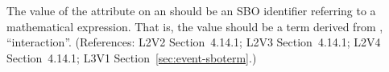 The value of the  attribute on an \Event should be
an SBO identifier referring to a mathematical expression.  That is, the
value should be a term derived from \sbointeractionID,
``interaction''.  (References: L2V2 Section~4.14.1; L2V3
Section~4.14.1; L2V4 Section~4.14.1; L3V1 Section~\ref{sec:event-sboterm}.)
